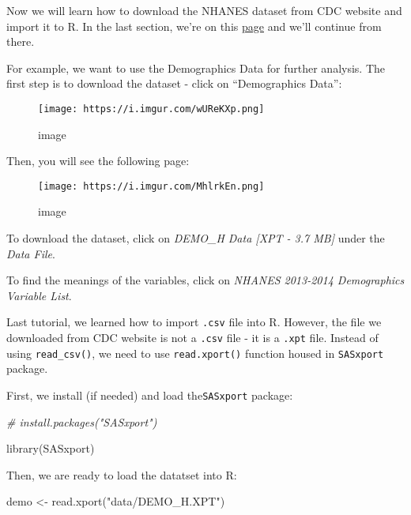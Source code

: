 \documentclass[
]{book}
\newenvironment{Shaded}{\begin{snugshade}}{\end{snugshade}}
\newcommand{\CommentTok}[1]{\textcolor[rgb]{0.56,0.35,0.01}{\textit{#1}}}
\newcommand{\FunctionTok}[1]{\textcolor[rgb]{0.00,0.00,0.00}{#1}}
\newcommand{\NormalTok}[1]{#1}
\newcommand{\OtherTok}[1]{\textcolor[rgb]{0.56,0.35,0.01}{#1}}
\newcommand{\StringTok}[1]{\textcolor[rgb]{0.31,0.60,0.02}{#1}}
\begin{document}
Now we will learn how to download the NHANES dataset from CDC website and import it to R. In the last section, we're on this \href{https://wwwn.cdc.gov/nchs/nhanes/continuousnhanes/default.aspx?BeginYear=2013}{page} and we'll continue from there.

For example, we want to use the Demographics Data for further analysis. The first step is to download the dataset - click on ``Demographics Data'':

\begin{figure}
\centering
\texttt{[image: https://i.imgur.com/wUReKXp.png]}
\caption{image}
\end{figure}

Then, you will see the following page:

\begin{figure}
\centering
\texttt{[image: https://i.imgur.com/MhlrkEn.png]}
\caption{image}
\end{figure}

To download the dataset, click on \emph{DEMO\_H Data {[}XPT - 3.7 MB{]}} under the \emph{Data File}.

To find the meanings of the variables, click on \emph{NHANES 2013-2014 Demographics Variable List}.

Last tutorial, we learned how to import \texttt{.csv} file into R. However, the file we downloaded from CDC website is not a \texttt{.csv} file - it is a \texttt{.xpt} file. Instead of using \texttt{read\_csv()}, we need to use \texttt{read.xport()} function housed in \texttt{SASxport} package.

First, we install (if needed) and load the\texttt{SASxport} package:

\begin{Shaded}
\begin{Highlighting}[]
\CommentTok{\# install.packages("SASxport")}
\end{Highlighting}
\end{Shaded}

\begin{Shaded}
\begin{Highlighting}[]
\FunctionTok{library}\NormalTok{(SASxport)}
\end{Highlighting}
\end{Shaded}

Then, we are ready to load the datatset into R:

\begin{Shaded}
\begin{Highlighting}[]
\NormalTok{demo }\OtherTok{\textless{}{-}} \FunctionTok{read.xport}\NormalTok{(}\StringTok{"data/DEMO\_H.XPT"}\NormalTok{)}
\end{Highlighting}
\end{Shaded}
\end{document}
